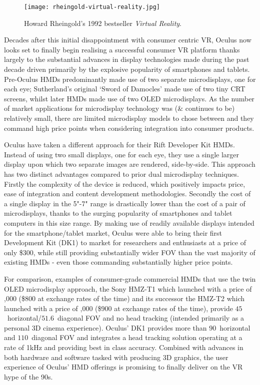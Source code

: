 \begin{figure}[h]
	\begin{center}
		\texttt{[image: rheingold-virtual-reality.jpg]}
		\caption{Howard Rheingold's 1992 bestseller \textit{Virtual Reality}.}
		\label{rheingold-virtual-reality.jpg}
	\end{center}
\end{figure}

Decades after this initial disappointment with consumer centric VR, Oculus now looks set to finally begin realising a successful consumer VR platform thanks largely to the substantial advances in display technologies made during the past decade driven primarily by the explosive popularity of smartphones and tablets. Pre-Oculus HMDs predominantly made use of two separate microdisplays, one for each eye; Sutherland's original `Sword of Damocles' made use of two tiny CRT screens, whilst later HMDs made use of two OLED microdisplays. As the number of market applications for microdisplay technology was (\& continues to be) relatively small, there are limited microdisplay models to chose between and they command high price points when considering integration into consumer products.

Oculus have taken a different approach for their Rift Developer Kit HMDs. Instead of using two small displays, one for each eye, they use a single larger display upon which two separate images are rendered, side-by-side. This approach has two distinct advantages compared to prior dual microdisplay techniques. Firstly the complexity of the device is reduced, which positively impacts price, ease of integration and content development methodologies. Secondly the cost of a single display in the 5"-7" range is drastically lower than the cost of a pair of microdisplays, thanks to the surging popularity of smartphones and tablet computers in this size range. By making use of readily available displays intended for the smartphone/tablet market, Oculus were able to bring their first Development Kit (DK1) to market for researchers and enthusiasts at a price of only \$300, while still providing substantially wider FOV than the vast majority of existing HMDs - even those commanding substantially higher price points.

For comparison, examples of consumer-grade commercial HMDs that use the twin OLED microdisplay approach, the Sony HMZ-T1 which launched with a price of ,000 (\$800 at exchange rates of the time) and its successor the HMZ-T2 which launched with a price of ,000 (\$900 at exchange rates of the time), provide $45$\textdegree\ horizontal/$51.6$\textdegree\ diagonal FOV and no head tracking (intended primarily as a personal 3D cinema experience). Oculus' DK1 provides more than $90$\textdegree\ horizontal and $110$\textdegree\ diagonal FOV and integrates a head tracking solution operating at a rate of 1kHz and providing best in class accuracy. Combined with advances in both hardware and software tasked with producing 3D graphics, the user experience of Oculus' HMD offerings is promising to finally deliver on the VR hype of the 90s.

